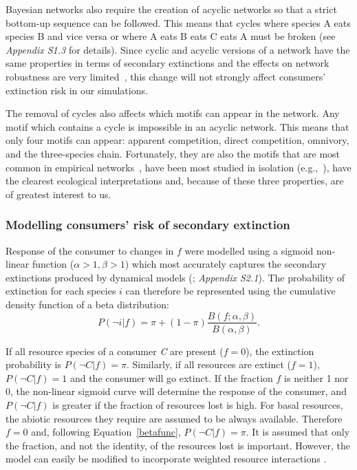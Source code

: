 \documentclass[12pt]{article}
\begin{document}
\begin{spacing}{1.0}
        
        Bayesian networks also require the creation of acyclic networks so that a strict bottom-up sequence can be followed. 
        This means that cycles where species A eats species B and vice versa or where A eats B eats C eats A must be broken (see \emph{Appendix S1.3} for details).
        Since cyclic and acyclic versions of a network have the same properties in terms of secondary extinctions and the effects on network robustness are very limited~\citep{Allesina2009functional}, this change will not strongly affect consumers' extinction risk in our simulations.

        
        The removal of cycles also affects which motifs can appear in the network. 
        Any motif which contains a cycle is impossible in an acyclic network.
        This means that only four motifs can appear: apparent competition, direct competition, omnivory, and the three-species chain.
        Fortunately, they are also the motifs that are most common in empirical networks~\citep{Stouffer2007}, have been most studied in isolation (e.g.,~\citealp[]{Bascompte2005,Kondoh2008,Laws2013}), have the clearest ecological interpretations and, because of these three properties, are of greatest interest to us.


        \subsubsection*{Modelling consumers' risk of secondary extinction} 
        
           Response of the consumer to changes in $f$ were modelled using a sigmoid non-linear function ($\alpha > 1, \beta > 1$) which most accurately captures the secondary extinctions produced by dynamical models (\citealp[]{Eklof2013}; \emph{Appendix S2.1}).
            The probability of extinction for each species $i$ can therefore be represented using the cumulative density function of a beta distribution:
    		\begin{equation}
    		P(\lnot i|f) = \pi + (1 - \pi) \frac{B(f;\alpha,\beta)}{B(\alpha,\beta)}.
    				\label{betafunc}
            \end{equation}
    		
            If all resource species of a consumer \textit{C} are present ($f = 0$), the extinction probability is $P(\lnot C|f) = \pi$. 
            Similarly, if all resources are extinct ($f = 1$), $P(\lnot C|f)=1$  and the consumer will go extinct.
            If the fraction $f$ is neither 1 nor 0, the non-linear sigmoid curve will determine the response of the consumer, and $P(\lnot C|f)$ is greater if the fraction of resources lost is high. 
            For basal resources, the abiotic resources they require are assumed to be always available.
            Therefore $f=0$ and, following Equation~\ref{betafunc}, $P(\lnot C|f) = \pi$.
            It is assumed that only the fraction, and not the identity, of the resources lost is important. 
            However, the model can easily be modified to incorporate weighted resource interactions \citep[see][]{Eklof2013}.
    		

\end{spacing}
\end{document}

